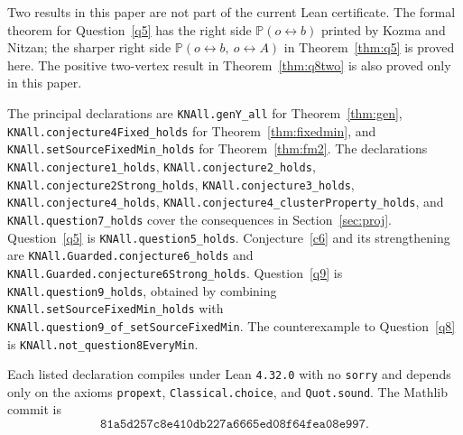 \documentclass[11pt]{article}
\theoremstyle{definition}
\theoremstyle{remark}
\newcommand{\PP}{\mathbb P}
\newcommand{\con}{\leftrightarrow}
\begin{document}
Two results in this paper are not part of the current Lean certificate. The formal
theorem for Question~\ref{q5} has the right side $\PP(o\con b)$ printed by Kozma and Nitzan;
the sharper right side $\PP(o\con b,\ o\con A)$ in Theorem~\ref{thm:q5} is proved here.
The positive two-vertex result in Theorem~\ref{thm:q8two} is also proved only in this
paper.

\begingroup
\raggedright
{}
\setlength{\parindent}{1.5em}
\setlength{\emergencystretch}{4em}
The principal declarations are \texttt{KNAll.genY\_all} for Theorem~\ref{thm:gen},
\texttt{KNAll.conjecture4Fixed\_holds} for Theorem~\ref{thm:fixedmin}, and
\texttt{KNAll.setSourceFixedMin\_holds} for Theorem~\ref{thm:fm2}. The declarations
\texttt{KNAll.conjecture1\_holds}, \texttt{KNAll.conjecture2\_holds},
\texttt{KNAll.conjecture2Strong\_holds}, \texttt{KNAll.conjecture3\_holds},
\texttt{KNAll.conjecture4\_holds},
\texttt{KNAll.conjecture4\_clusterProperty\_holds}, and
\texttt{KNAll.question7\_holds} cover the consequences in
Section~\ref{sec:proj}. Question~\ref{q5} is \texttt{KNAll.question5\_holds}.
Conjecture~\ref{c6} and its strengthening are \texttt{KNAll.Guarded.conjecture6\_holds}
and \texttt{KNAll.Guarded.conjecture6Strong\_holds}. Question~\ref{q9} is
\texttt{KNAll.question9\_holds}, obtained by combining
\texttt{KNAll.setSourceFixedMin\_holds} with
\texttt{KNAll.question9\_of\_setSourceFixedMin}. The counterexample to
Question~\ref{q8} is \texttt{KNAll.not\_question8EveryMin}.

Each listed declaration compiles under Lean \texttt{4.32.0} with no \texttt{sorry} and
depends only on the axioms \texttt{propext}, \texttt{Classical.choice}, and
\texttt{Quot.sound}. The Mathlib commit is
\[
 \texttt{81a5d257c8e410db227a6665ed08f64fea08e997}.
\]
\endgroup
\end{document}
